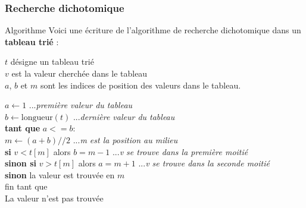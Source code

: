 \documentclass[9pt]{beamer}
\newcommand{\esp}{\hspace{0.5cm}}
\begin{document}
\begin{frame}
\frametitle{Recherche dichotomique}

\begin{block}{Algorithme}
Voici une écriture de l'algorithme de recherche dichotomique dans un \textbf{tableau trié} :\medskip

$t$ désigne un tableau trié\\
$v$ est la valeur cherchée dans le tableau\\
$a$, $b$ et $m$ sont les indices de position des valeurs dans le tableau.\medskip

$a \longleftarrow 1$ \hfill ...\textit{première valeur du tableau}\\
$b \longleftarrow \text{longueur}(t)$  \hfill ...\textit{dernière valeur du tableau}\\
\textbf{tant que} $a <= b$: \\
\esp $m \longleftarrow (a+b)//2 $ \hfill ...\textit{m est la position au milieu} \\
\esp \textbf{si} $v<t[m]$ alors $b=m-1$ \hfill ...\textit{v se trouve dans la première moitié}\\
\esp \textbf{sinon si} $v>t[m]$ alors $a=m+1$  \hfill ...\textit{v se trouve dans la seconde moitié}\\
\esp \textbf{sinon} la valeur est trouvée en $m$\\
fin tant que\\
La valeur n'est pas trouvée
\end{block}

\end{frame}
\end{document}
